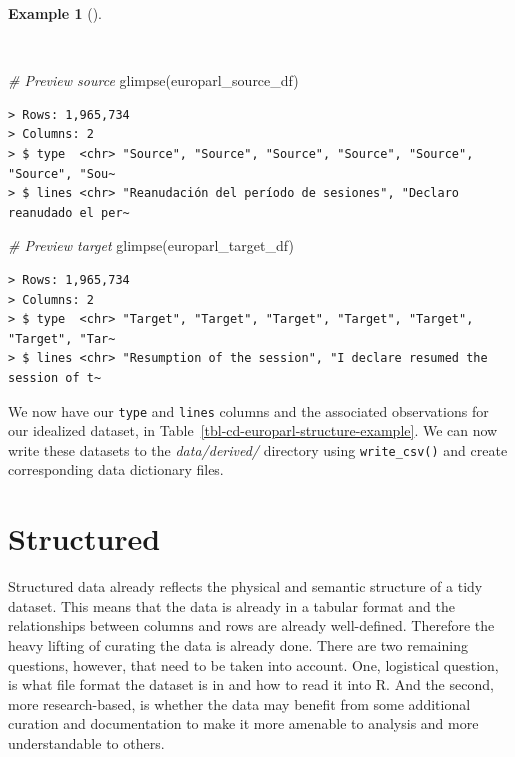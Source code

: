 \documentclass[
  letterpaper,
  DIV=11,
  numbers=noendperiod]{scrreprt}
\newenvironment{Shaded}{\begin{snugshade}}{\end{snugshade}}
\newcommand{\CommentTok}[1]{\textcolor[rgb]{0.00,0.00,0.00}{\textit{#1}}}
\newcommand{\FunctionTok}[1]{\textcolor[rgb]{0.00,0.00,0.00}{#1}}
\newcommand{\NormalTok}[1]{\textcolor[rgb]{0.00,0.00,0.00}{#1}}
\theoremstyle{definition}
\newtheorem{example}{Example}[chapter]
\theoremstyle{remark}
\begin{document}
\begin{example}[]\protect\hypertarget{exm-cd-europarl-glimpse}{}\label{exm-cd-europarl-glimpse}

~

\begin{Shaded}
\begin{Highlighting}[]
\CommentTok{\# Preview source}
\FunctionTok{glimpse}\NormalTok{(europarl\_source\_df)}
\end{Highlighting}
\end{Shaded}

\begin{verbatim}
> Rows: 1,965,734
> Columns: 2
> $ type  <chr> "Source", "Source", "Source", "Source", "Source", "Source", "Sou~
> $ lines <chr> "Reanudación del período de sesiones", "Declaro reanudado el per~
\end{verbatim}

\begin{Shaded}
\begin{Highlighting}[]
\CommentTok{\# Preview target}
\FunctionTok{glimpse}\NormalTok{(europarl\_target\_df)}
\end{Highlighting}
\end{Shaded}

\begin{verbatim}
> Rows: 1,965,734
> Columns: 2
> $ type  <chr> "Target", "Target", "Target", "Target", "Target", "Target", "Tar~
> $ lines <chr> "Resumption of the session", "I declare resumed the session of t~
\end{verbatim}

\end{example}

We now have our \texttt{type} and \texttt{lines} columns and the
associated observations for our idealized dataset, in
Table~\ref{tbl-cd-europarl-structure-example}. We can now write these
datasets to the \emph{data/derived/} directory using
\texttt{write\_csv()} and create corresponding data dictionary files.

\section{Structured}\label{structured}

Structured data already reflects the physical and semantic structure of
a tidy dataset. This means that the data is already in a tabular format
and the relationships between columns and rows are already well-defined.
Therefore the heavy lifting of curating the data is already done. There
are two remaining questions, however, that need to be taken into
account. One, logistical question, is what file format the dataset is in
and how to read it into R. And the second, more research-based, is
whether the data may benefit from some additional curation and
documentation to make it more amenable to analysis and more
understandable to others.
\end{document}
